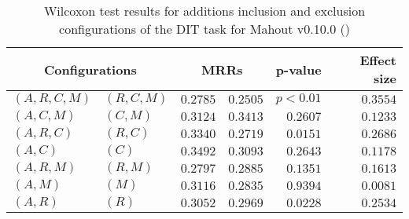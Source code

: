 
\begin{table}
\begin{spacing}{1.2}
\centering
\caption{Wilcoxon test results for additions inclusion and exclusion configurations of the DIT task for Mahout v0.10.0 (\ctwo)}
\label{table:versus-wilcox-mahout-dit-additions}
\begin{tabular}{ll|rr|rr}
\toprule
      \multicolumn{2}{c|}{Configurations} &                \multicolumn{2}{c|}{MRRs} &             p-value & Effect size \\
\midrule
 $(A,R,C,M)$ &  $(R,C,M)$ &  $\bm{0.2785}$ &       $0.2505$ & $p<0.01$ &    $0.3554$ \\
   $(A,C,M)$ &    $(C,M)$ &       $0.3124$ &  $\bm{0.3413}$ & $0.2607$ &    $0.1233$ \\
   $(A,R,C)$ &    $(R,C)$ &  $\bm{0.3340}$ &       $0.2719$ & $0.0151$ &    $0.2686$ \\
     $(A,C)$ &      $(C)$ &  $\bm{0.3492}$ &       $0.3093$ & $0.2643$ &    $0.1178$ \\
   $(A,R,M)$ &    $(R,M)$ &       $0.2797$ &  $\bm{0.2885}$ & $0.1351$ &    $0.1613$ \\
     $(A,M)$ &      $(M)$ &  $\bm{0.3116}$ &       $0.2835$ & $0.9394$ &    $0.0081$ \\
     $(A,R)$ &      $(R)$ &  $\bm{0.3052}$ &       $0.2969$ & $0.0228$ &    $0.2534$ \\
\bottomrule
\end{tabular}

\end{spacing}
\end{table}

